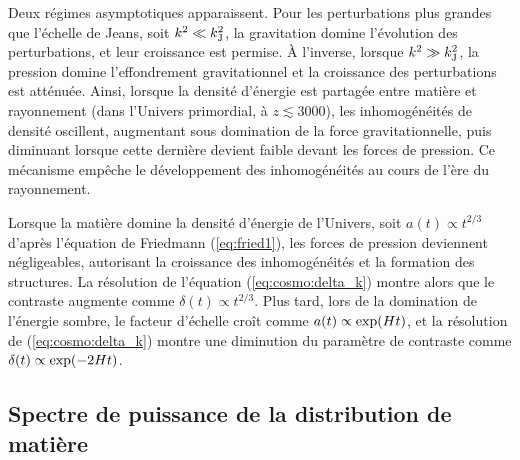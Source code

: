 Deux régimes asymptotiques apparaissent.
Pour les perturbations plus grandes que l'échelle de Jeans, soit $k^2 \ll k_{\rm J}^2$, la gravitation domine l'évolution des perturbations, et leur croissance est permise.
À l'inverse, lorsque $k^2 \gg k_{\rm J}^2$, la pression domine l'effondrement gravitationnel et la croissance des perturbations est atténuée.
Ainsi, lorsque la densité d'énergie est partagée entre matière et rayonnement (dans l'Univers primordial, à $z \lesssim 3000$), les inhomogénéités de densité oscillent, augmentant sous domination de la force gravitationnelle, puis diminuant lorsque cette dernière devient faible devant les forces de pression.
Ce mécanisme empêche le développement des inhomogénéités au cours de l'ère du rayonnement.

Lorsque la matière domine la densité d'énergie de l'Univers, soit $a(t) \propto t^{2/3}$ d'après l'équation de Friedmann (\ref{eq:fried1}), les forces de pression deviennent négligeables, autorisant la croissance des inhomogénéités et la formation des structures.
La résolution de l'équation (\ref{eq:cosmo:delta_k}) montre alors que le contraste augmente comme $\delta(t) \propto t^{2/3}$.
Plus tard, lors de la domination de l'énergie sombre, le facteur d'échelle croît comme $a(t) \propto {\rm exp}(Ht)$, et la résolution de (\ref{eq:cosmo:delta_k}) montre une diminution du paramètre de contraste comme $\delta(t) \propto {\rm exp}(-2Ht)$.

\subsection{Spectre de puissance de la distribution de matière}


